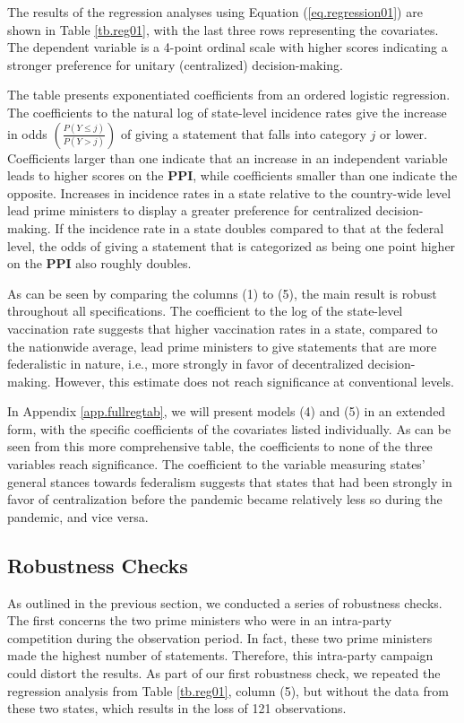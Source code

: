 \documentclass[12pt, abstract=true]{scrartcl}
\begin{document}
The results of the regression analyses using Equation (\ref{eq.regression01}) are shown in Table \ref{tb.reg01}, with the last three rows representing the covariates. The dependent variable is a 4-point ordinal scale with higher scores indicating a stronger preference for unitary (centralized) decision-making.



The table presents exponentiated coefficients from an ordered logistic regression. The coefficients to the natural log of state-level incidence rates give the increase in odds $\left( \frac{P(Y \leq j)}{P(Y > j)} \right)$ of giving a statement that falls into category $j$ or lower. Coefficients larger than one indicate that an increase in an independent variable leads to higher scores on the \textbf{PPI}, while coefficients smaller than one indicate the opposite. Increases in incidence rates in a state relative to the country-wide level lead prime ministers to display a greater preference for centralized decision-making. If the incidence rate in a state doubles compared to that at the federal level, the odds of giving a statement that is categorized as being one point higher on the \textbf{PPI} also roughly doubles.

As can be seen by comparing the columns (1) to (5), the main result is robust throughout all specifications. The coefficient to the log of the state-level vaccination rate suggests that higher vaccination rates in a state, compared to the nationwide average, lead prime ministers to give statements that are more federalistic in nature, i.e., more strongly in favor of decentralized decision-making. However, this estimate does not reach significance at conventional levels.

In Appendix \ref{app.fullregtab}, we will present models (4) and (5) in an extended form, with the specific coefficients of the covariates listed individually. As can be seen from this more comprehensive table, the coefficients to none of the three variables reach significance. The coefficient to the variable measuring states’ general stances towards federalism suggests that states that had been strongly in favor of centralization before the pandemic became relatively less so during the pandemic, and vice versa.

\subsection{Robustness Checks}
As outlined in the previous section, we conducted a series of robustness checks. The first concerns the two prime ministers who were in an intra-party competition during the observation period. In fact, these two prime ministers made the highest number of statements. Therefore, this intra-party campaign could distort the results. As part of our first robustness check, we repeated the regression analysis from  Table \ref{tb.reg01}, column (5), but without the data from these two states, which results in the loss of 121 observations.
\end{document}
